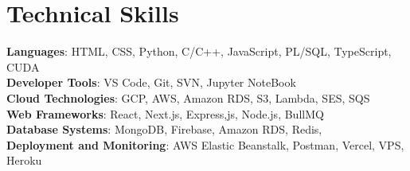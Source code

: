 \section{Technical Skills}
 \begin{itemize}[leftmargin=0.15in, label={}]
    \small{\item{
     \textbf{Languages}{: HTML, CSS, Python, C/C++, JavaScript, PL/SQL, TypeScript, CUDA} \\
     \textbf{Developer Tools}{: VS Code, Git, SVN, Jupyter NoteBook } \\
     \textbf{Cloud Technologies}{: GCP, AWS, Amazon RDS, S3, Lambda, SES, SQS } \\
     \textbf{Web Frameworks}{: React, Next.js, Express,js, Node.js, BullMQ } \\
     \textbf{Database Systems}{: MongoDB, Firebase, Amazon RDS, Redis, } \\
     \textbf{Deployment and Monitoring}{: AWS Elastic Beanstalk, Postman, Vercel, VPS, Heroku} \\
    }}
 \end{itemize}
 \vspace{-16pt}
